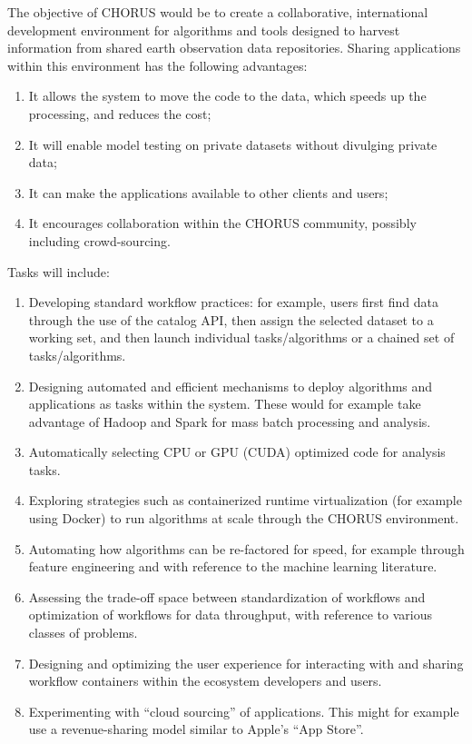 
The objective of CHORUS would be to create a collaborative,
international development environment for algorithms and tools
designed to harvest information from shared earth observation data
repositories. Sharing applications within this environment has the
following advantages:
\begin{enumerate}
	\item It allows the system to move the code to the data, which
          speeds up the processing, and reduces the cost;
        \item It will enable model testing on private datasets without
          divulging private data;
	\item It can make the applications available to other clients
          and users;
	\item It encourages collaboration within the CHORUS community,
          possibly including crowd-sourcing.
\end{enumerate}

Tasks will include:
\begin{enumerate}
	\item Developing standard workflow practices: for example,
          users first find data through the use of the catalog API,
          then assign the selected dataset to a working set, and then
          launch individual tasks/algorithms or a chained set of
          tasks/algorithms.
	\item Designing automated and efficient mechanisms to deploy
          algorithms and applications as tasks within the system.
          These would for example take advantage of Hadoop and Spark
          for mass batch processing and analysis.
	\item Automatically selecting CPU or GPU (CUDA) optimized code
          for analysis tasks.
	\item Exploring strategies such as containerized runtime
          virtualization (for example using Docker) to run algorithms
          at scale through the CHORUS environment.
	\item Automating how algorithms can be re-factored for speed,
          for example through feature engineering and with reference
          to the machine learning literature.
	\item Assessing the trade-off space between standardization of
          workflows and optimization of workflows for data throughput,
          with reference to various classes of problems.
	\item Designing and optimizing the user experience for
          interacting with and sharing workflow containers within the
          ecosystem developers and users.
	\item Experimenting with ``cloud sourcing'' of applications.
          This might for example use a revenue-sharing model similar
          to Apple's ``App Store''.
\end{enumerate}

